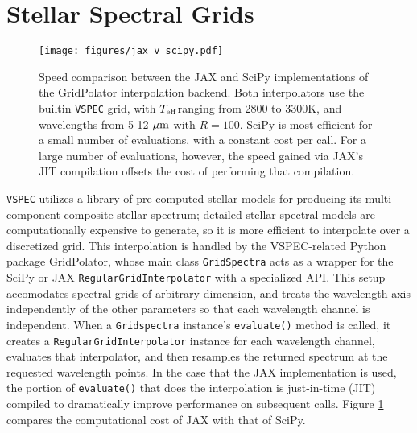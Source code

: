 \documentclass[linenumbers,5p,twocolumn,authoryear]{elsarticle}
\newcommand{\teff}{$T_{\rm eff}$}
\newcommand{\vspec}[1]{\texttt{VSPEC}#1}
\begin{document}
\section{Stellar Spectral Grids}
\label{sec:gridpolator}

\begin{figure}[h]
    \centering
    \texttt{[image: figures/jax\_v\_scipy.pdf]}
    \caption{
        Speed comparison between the JAX and SciPy implementations of the GridPolator interpolation backend. Both interpolators use the builtin \vspec{} grid, with \teff ranging from 2800 to 3300K, and wavelengths from 5-12 ${\rm \mu m}$ with $R=100$. SciPy is most efficient for a small number of evaluations, with a constant cost per call. For a large number of evaluations, however, the speed gained via JAX's JIT compilation offsets the cost of performing that compilation.
    }
    \label{fig:jax_v_scipy}
\end{figure}

\vspec{} utilizes a library of pre-computed stellar models for producing its multi-component composite stellar spectrum; detailed stellar spectral models are computationally expensive to generate, so it is more efficient to interpolate over a discretized grid. This interpolation is handled by the VSPEC-related Python package GridPolator, whose main class \texttt{GridSpectra} acts as a wrapper for the SciPy \citep{virtanen2020} or JAX \citep{bradbury2018} \texttt{RegularGridInterpolator} with a specialized API. This setup accomodates spectral grids of arbitrary dimension, and treats the wavelength axis independently of the other parameters so that each wavelength channel is independent. When a \texttt{Gridspectra} instance's \texttt{evaluate()} method is called, it creates a \texttt{RegularGridInterpolator} instance for each wavelength channel, evaluates that interpolator, and then resamples the returned spectrum at the requested wavelength points. In the case that the JAX implementation is used, the portion of \texttt{evaluate()} that does the interpolation is just-in-time (JIT) compiled to dramatically improve performance on subsequent calls. Figure \ref{fig:jax_v_scipy} compares the computational cost of JAX with that of SciPy.
\end{document}
